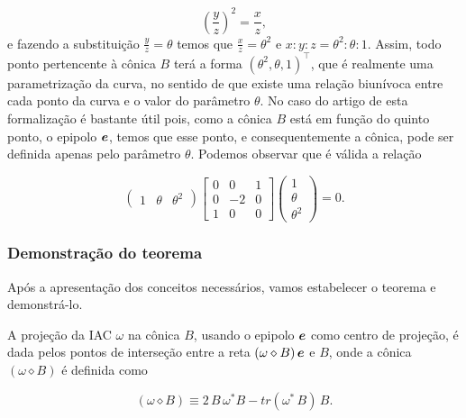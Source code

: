 \begin{equation*}
\left(\frac{y}{z}\right)^2=\frac{x}{z},
\end{equation*}
e fazendo a substituição $\displaystyle{\frac{y}{z}=\theta}$ temos que $\displaystyle{\frac{x}{z}=\theta^2}$ e $x:y:z=\theta^2:\theta:1$.
Assim, todo ponto pertencente à cônica $B$ terá a forma $(\theta^2,\theta,1)^\top$, que é realmente uma parametrização da curva, no sentido de que existe uma relação biunívoca entre cada ponto da curva e o valor do parâmetro $\theta$. No caso do artigo de \citep{2503343} esta formalização é bastante útil pois, como a cônica $B$ está em função do quinto ponto, o epipolo $\boldsymbol{e}$, temos que esse ponto, e consequentemente a cônica, pode ser definida apenas pelo parâmetro $\theta$. Podemos observar que é válida a relação

\begin{equation*}
\begin{pmatrix}
1&\theta&\theta^2
\end{pmatrix}
\begin{bmatrix}
0&0&1\\
0&-2&0\\
1&0&0
\end{bmatrix}
\begin{pmatrix}
1\\
\theta\\
\theta^2
\end{pmatrix}
=0.
\end{equation*}


\subsubsection{Demonstração do teorema}

Após a apresentação dos conceitos necessários, vamos estabelecer o teorema e demonstrá-lo.

\begin{teorema}
A projeção da IAC $\omega$ na cônica $B$, usando o epipolo $\boldsymbol{e}$ como centro de projeção, é dada pelos pontos de interseção entre a reta $(\omega\diamond B)\,\boldsymbol{e}$ e $B$, onde a cônica $(\omega\diamond B)$ é definida como

\begin{equation}\label{eq.conica-diamond}
(\omega \diamond B)\equiv 2\,B\,\omega^*B - tr(\omega^*\,B)\,B.
\end{equation}
\end{teorema}

